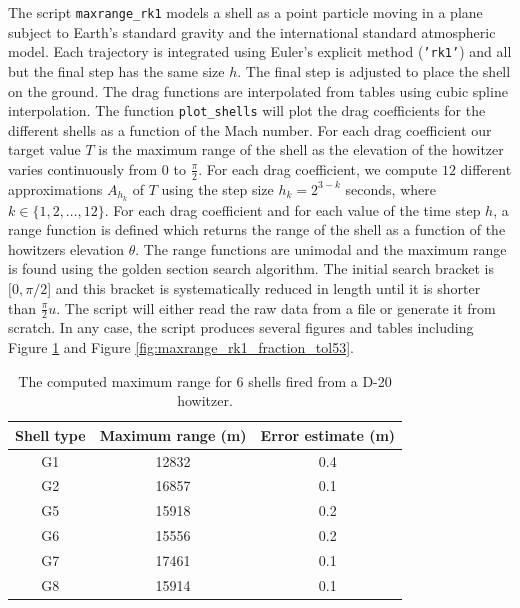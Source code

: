 \documentclass[runningheads]{llncs}
\begin{document}
The script {\tt maxrange\_rk1} models a shell as a point particle moving in a plane subject to Earth's standard gravity and the international standard atmospheric model.
Each trajectory is integrated using Euler's explicit method ({\tt 'rk1'}) and all but the final step has the same size $h$. The final step is adjusted to place the shell on the ground. The drag functions are interpolated from tables using cubic spline interpolation. The function {\tt plot\_shells} will plot the drag coefficients for the different shells as a function of the Mach number.
For each drag coefficient our target value $T$ is the maximum range of the shell as the elevation of the howitzer varies continuously from $0$ to $\frac{\pi}{2}$. For each drag coefficient, we compute $12$ different approximations $A_{h_k}$ of $T$ using the step size $h_k = 2^{3-k}$ seconds, where $k \in \{1,2,\dots,12\}$.
For each drag coefficient and for each value of the time step $h$, a range function is defined which returns the range of the shell as a function of the howitzers elevation $\theta$.
The range functions are unimodal and the maximum range is found using the golden section search algorithm.
The initial search bracket is $[0,\pi/2$] and this bracket is systematically reduced in length until it is shorter than $\frac{\pi}{2}u$.
The script will either read the raw data from a file or generate it from scratch.
In any case, the script produces several figures and tables including Figure \ref{fig:maxrange_rk1_table_tol53} and Figure \ref{fig:maxrange_rk1_fraction_tol53}.
\begin{table}
 \caption{The computed maximum range for 6 shells fired from a D-20 howitzer.}
 \label{fig:maxrange_rk1_table_tol53} 
 \centering
 \vspace{.25cm}
 \begin{tabular}{c|c|c}
   Shell type & Maximum range (m) & Error estimate (m) \\ \hline
   G1      &     12832    &            0.4 \\
   G2      &     16857    &            0.1 \\
   G5      &     15918    &            0.2 \\
   G6      &     15556    &            0.2 \\
   G7      &     17461    &            0.1 \\
   G8      &     15914    &            0.1 \\
   \hline
 \end{tabular}
\end{table}
\end{document}
